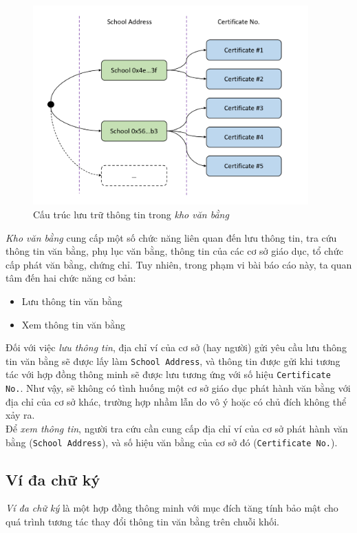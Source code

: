 \begin{figure}[!ht]
    \centering
    \includegraphics[width=400px]{images/certs-tree.png}
    \caption{Cấu trúc lưu trữ thông tin trong \textit{kho văn bằng}}
\end{figure}

\textit{Kho văn bằng} cung cấp một số chức năng liên quan đến lưu thông tin, tra cứu thông tin văn bằng, phụ lục văn bằng, thông tin của các cơ sở giáo dục, tổ chức cấp phát văn bằng, chứng chỉ. Tuy nhiên, trong phạm vi bài báo cáo này, ta quan tâm đến hai chức năng cơ bản:
\begin{itemize}
    \item Lưu thông tin văn bằng
    \item Xem thông tin văn bằng
\end{itemize}

Đối với việc \textit{lưu thông tin}, địa chỉ ví của cơ sở (hay người) gửi yêu cầu lưu thông tin văn bằng sẽ được lấy làm \texttt{School Address}, và thông tin được gửi khi tương tác với hợp đồng thông minh sẽ được lưu tương ứng với số hiệu \texttt{Certificate No.}. Như vậy, sẽ không có tình huống một cơ sở giáo dục phát hành văn bằng với địa chỉ của cơ sở khác, trường hợp nhầm lẫn do vô ý hoặc có chủ đích không thể xảy ra.\\

Để \textit{xem thông tin}, người tra cứu cần cung cấp địa chỉ ví của cơ sở phát hành văn bằng (\texttt{School Address}), và số hiệu văn bằng của cơ sở đó (\texttt{Certificate No.}).


\subsection{Ví đa chữ ký}
\textit{Ví đa chữ ký} là một hợp đồng thông minh với mục đích tăng tính bảo mật cho quá trình tương tác thay đổi thông tin văn bằng trên chuỗi khối.\\

